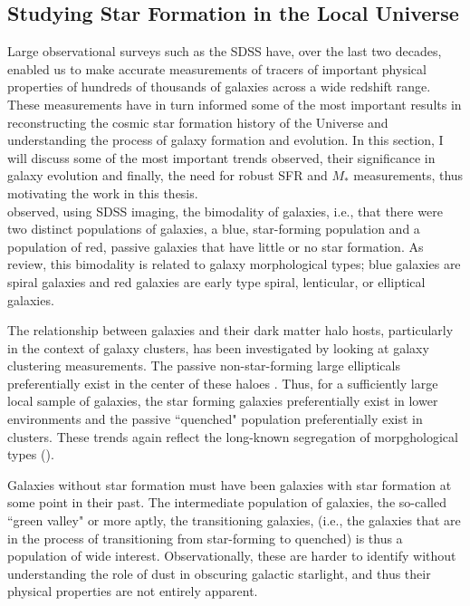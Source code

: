 \subsection{Studying Star Formation in the Local Universe}
\label{sec: results}

Large observational surveys such as the SDSS have, over the last two
decades, enabled us to make accurate measurements of tracers of
important physical properties of hundreds of thousands of galaxies
across a wide redshift range. These measurements have in turn informed
some of the most important results in reconstructing the cosmic star
formation history of the Universe and understanding the process of
galaxy formation and evolution. In this section, I will discuss some
of the most important trends observed, their significance in galaxy
evolution and finally, the need for robust SFR and $M_{*}$
measurements, thus motivating the work in this thesis.\\

\citet{2001AJ....122.1861S} observed, using SDSS imaging, the
bimodality of galaxies, i.e., that there were two distinct populations
of galaxies, a blue, star-forming population and a population of red,
passive galaxies that have little or no star formation. As
\citet{blanton_physical_2009-1} review, this bimodality is related to
galaxy morphological types; blue galaxies are spiral galaxies and red
galaxies are early type spiral, lenticular, or elliptical galaxies.

The relationship between galaxies and their dark matter halo hosts,
particularly in the context of galaxy clusters, has been investigated
by looking at galaxy clustering measurements.  The passive
non-star-forming large ellipticals preferentially exist in the center
of these haloes \citep{2005ApJ...633..791Z}. Thus, for a sufficiently
large local sample of galaxies, the star forming galaxies
preferentially exist in lower environments and the passive ``quenched"
population preferentially exist in clusters. These trends again
reflect the long-known segregation of morpghological types
(\citealt{dressler_galaxy_1980}).

Galaxies without star formation must have been galaxies with star
formation at some point in their past. The intermediate population of
galaxies, the so-called ``green valley" \citep{2007ApJS..173..293W} or
more aptly, the transitioning galaxies, (i.e., the galaxies that are
in the process of transitioning from star-forming to quenched) is thus
a population of wide interest. Observationally, these are harder to
identify without understanding the role of dust in obscuring galactic
starlight, and thus their physical properties are not entirely
apparent.\\

